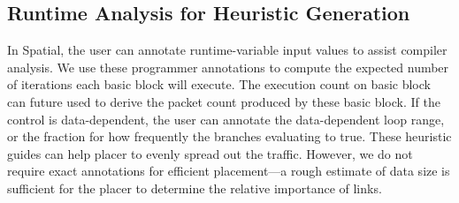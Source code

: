 
\subsection{Runtime Analysis for Heuristic Generation} \label{sec:heuristic}

In Spatial, the user can annotate runtime-variable input values to assist compiler analysis.  
We use these programmer annotations to compute the expected number of iterations each basic block
will execute. 
The execution count on basic block can future used to derive the packet count produced
by these basic block.
If the control is data-dependent, the user can annotate the data-dependent loop range, or the
fraction for how frequently the branches evaluating to true.
These heuristic guides can help placer to evenly spread out the traffic.
However, we do not require exact annotations for efficient placement---a rough estimate of 
data size is sufficient for the placer to determine the relative importance of links.


